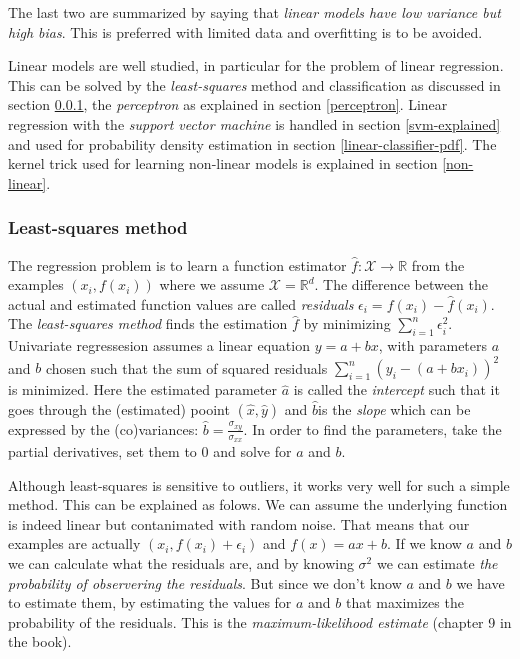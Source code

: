 The last two are summarized by saying that \emph{linear models have low variance but high bias}.
This is preferred with limited data and overfitting is to be avoided.

Linear models are well studied, in particular for the problem of linear regression.
This can be solved by the \emph{least-squares} method and classification as discussed in section \ref{least-squares}, the \emph{perceptron} as explained in section \ref{perceptron}.
Linear regression with the \emph{support vector machine} is handled in section \ref{svm-explained} and used for probability density estimation in section \ref{linear-classifier-pdf}.
The kernel trick used for learning non-linear models is explained in section \ref{non-linear}.


\subsubsection{Least-squares method}\label{least-squares}
The regression problem is to learn a function estimator $\hat{f}:\mathcal{X} \to \mathbb{R}$ from the examples $(x_i, f(x_i))$ where we assume $\mathcal{X} = \mathbb{R}^d$.
The difference between the actual and estimated function values are called \emph{residuals} $\epsilon_i = f(x_i) - \hat{f}(x_i)$.
The \emph{least-squares method} finds the estimation $\hat{f}$ by minimizing $\sum_{i=1}^{n} \epsilon_i^2$.
Univariate regressesion assumes a linear equation $y = a + b x$, with parameters $a$ and $b$ chosen such that the sum of squared residuals $\sum_{i=1}^{n} (y_i - (a + b x_i))^2$ is minimized.
Here the estimated parameter $\hat{a}$ is called the \emph{intercept} such that it goes through the (estimated) pooint $(\hat{x},\hat{y})$ and $\hat{b}$is the \emph{slope} which can be expressed by the (co)variances: $\hat{b} = \frac{\sigma_{xy}}{\sigma_{xx}}$.
In order to find the parameters, take the partial derivatives, set them to $0$ and solve for $a$ and $b$.

Although least-squares is sensitive to outliers, it works very well for such a simple method.
This can be explained as folows.
We can assume the underlying function is indeed linear but contanimated with random noise.
That means that our examples are actually $(x_i, f(x_i) + \epsilon_i)$ and $f(x) = ax + b$.
If we know $a$ and $b$ we can calculate what the residuals are, and by knowing $\sigma^2$ we can estimate \emph{the probability of observering the residuals}.
But since we don't know $a$ and $b$ we have to estimate them, by estimating the values for $a$ and $b$ that maximizes the probability of the residuals.
This is the \emph{maximum-likelihood estimate} (chapter 9 in the book).

